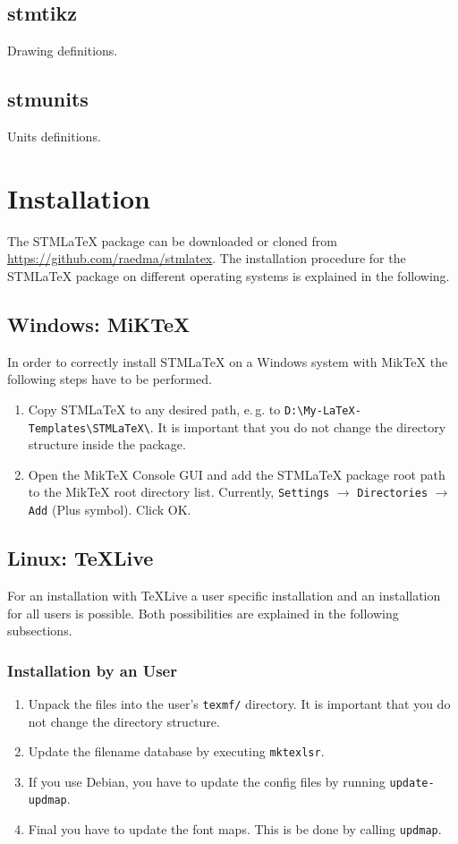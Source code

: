 \documentclass[%
  type=article,%
  layout=koma,%
  page=false,%
  hyperref=true,%
  cleveref=true,%
  conditionallox=true,%
  conditionalloxnewpage=true,%
  date=true,%
  glossaries=true,%
  index=true,%
  listings=true%
]{stmtext}
\newcommand{\package}[1]{\subsection*{#1}\par\medskip\noindent\ignorespaces}
\newcommand{\stmlatex}{STM\LaTeX\xspace}
\begin{document}
\package{stmtikz}
Drawing definitions.

\package{stmunits}
Units definitions.

\section{Installation}

The \stmlatex package can be downloaded or cloned from \url{https://github.com/raedma/stmlatex}. The installation procedure for the \stmlatex package on different operating systems is explained in the following.

\subsection{Windows: MiKTeX}

In order to correctly install \stmlatex on a Windows system with MikTeX the following steps have to be performed. 

\begin{enumerate}
  \item Copy \stmlatex to any desired path, e.\,g. to \texttt{D:\textbackslash My-LaTeX-Templates\textbackslash STMLaTeX\textbackslash}. It is important that you do not change the directory structure inside the package.
  \item Open the MikTeX Console GUI and add the \stmlatex package root path to the MikTeX root directory list. Currently, \texttt{Settings} $\rightarrow$ \texttt{Directories} $\rightarrow$ \texttt{Add} (Plus symbol). Click OK.
\end{enumerate}

\subsection{Linux: TeXLive}

For an installation with TeXLive a user specific installation and an installation for all users is possible. Both possibilities are explained in the following subsections.

\subsubsection{Installation by an User}
\begin{enumerate}		
  \item Unpack the files into the user's \texttt{texmf/} directory. It is important that you do not change the directory structure.
  \item Update the filename database by executing \texttt{mktexlsr}.
  \item If you use Debian, you have to update the config files by running \texttt{update-updmap}.
  \item Final you have to update the font maps. This is be done by calling \texttt{updmap}.
\end{enumerate}
\end{document}
